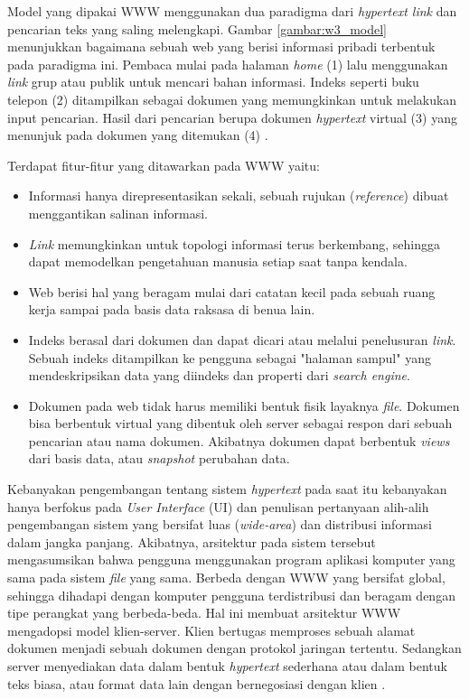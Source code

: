 Model yang dipakai WWW menggunakan dua paradigma dari \textit{hypertext link} dan pencarian teks yang saling melengkapi. Gambar \ref{gambar:w3_model} menunjukkan bagaimana sebuah web yang berisi informasi pribadi terbentuk pada paradigma ini. Pembaca mulai pada halaman \textit{home} (1) lalu menggunakan \textit{link} grup atau publik untuk mencari bahan informasi. Indeks seperti buku telepon (2) ditampilkan sebagai dokumen yang memungkinkan untuk melakukan input pencarian. Hasil dari pencarian berupa dokumen \textit{hypertext} virtual (3) yang menunjuk pada dokumen yang ditemukan (4) \citep{bernersLee1992}.

Terdapat fitur-fitur yang ditawarkan pada WWW yaitu:

\begin{itemize}
  \item Informasi hanya direpresentasikan sekali, sebuah rujukan (\textit{reference}) dibuat menggantikan salinan informasi.
  \item \textit{Link} memungkinkan untuk topologi informasi terus berkembang, sehingga dapat memodelkan pengetahuan manusia setiap saat tanpa kendala.
  \item Web berisi hal yang beragam mulai dari catatan kecil pada sebuah ruang kerja sampai pada basis data raksasa di benua lain.
  \item Indeks berasal dari dokumen dan dapat dicari atau melalui penelusuran \textit{link}. Sebuah indeks ditampilkan ke pengguna sebagai "halaman sampul" yang mendeskripsikan data yang diindeks dan properti dari \textit{search engine}.
  \item Dokumen pada web tidak harus memiliki bentuk fisik layaknya \textit{file}. Dokumen bisa berbentuk virtual yang dibentuk oleh server sebagai respon dari sebuah pencarian atau nama dokumen. Akibatnya dokumen dapat berbentuk \textit{views} dari basis data, atau \textit{snapshot} perubahan data.
\end{itemize}

Kebanyakan pengembangan tentang sistem \textit{hypertext} pada saat itu kebanyakan hanya berfokus pada \textit{User Interface} (UI) dan penulisan pertanyaan alih-alih pengembangan sistem yang bersifat luas (\textit{wide-area}) dan distribusi informasi dalam jangka panjang. Akibatnya, arsitektur pada sistem tersebut mengasumsikan bahwa pengguna menggunakan program aplikasi komputer yang sama pada sistem \textit{file} yang sama. Berbeda dengan WWW yang bersifat global, sehingga dihadapi dengan komputer pengguna terdistribusi dan beragam dengan tipe perangkat yang berbeda-beda. Hal ini membuat arsitektur WWW mengadopsi model klien-server. Klien bertugas memproses sebuah alamat dokumen menjadi sebuah dokumen dengan protokol jaringan tertentu. Sedangkan server menyediakan data dalam bentuk \textit{hypertext} sederhana atau dalam bentuk teks biasa, atau format data lain dengan bernegosiasi dengan klien \citep{bernersLee1992}.

